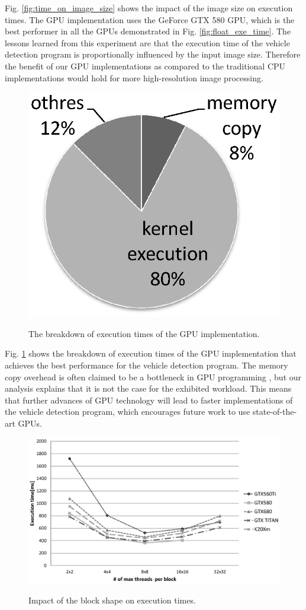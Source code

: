Fig. \ref{fig:time_on_image_size} shows the impact of the image size on
execution times. 
The GPU implementation uses the GeForce GTX 580 GPU, which is the best
performer in all the GPUs demonstrated in Fig. \ref{fig:float_exe_time}.
The lessons learned from this experiment are that the execution time of
the vehicle detection program is proportionally influenced by the input
image size.
Therefore the benefit of our GPU implementations as compared to the
traditional CPU implementations would hold for more high-resolution
image processing.

\begin{figure}[t]
 \begin{center}
  \includegraphics[width=0.49\hsize]{fig/breakdown_gpu.eps}\\
  \caption{The breakdown of execution times of the GPU implementation.}
  \label{fig:breakdown_gpu}
 \end{center}
\end{figure}

Fig. \ref{fig:breakdown_gpu} shows the breakdown of execution times of
the GPU implementation that achieves the best performance for the
vehicle detection program.
The memory copy overhead is often claimed to be a bottleneck in GPU
programming \cite{Jablin_PLDI11}, but our analysis explains that it is
not the case for the exhibited workload.
This means that further advances of GPU technology will lead to faster
implementations of the vehicle detection program, which encourages
future work to use state-of-the-art GPUs.

\begin{figure}[t]
 \begin{center}
  \includegraphics[width=\hsize]{fig/impact_of_blockshape.eps}\\
  \caption{Impact of the block shape on execution times.}
  \label{fig:impact_of_blockshape}
 \end{center}
\end{figure}

